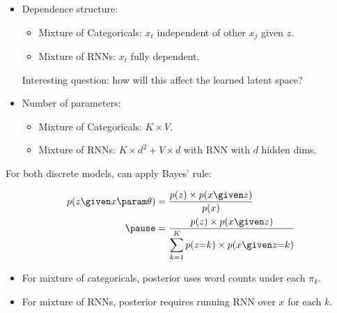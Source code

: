 \begin{frame}
    
    
    
\begin{itemize}
\item Dependence structure:
\begin{itemize}
    \item Mixture of Categoricals: $x_t$ independent of other $x_j$ given $z$.
    \item Mixture of RNNs: $x_t$ fully dependent.
\end{itemize}
Interesting question: how will this affect the learned latent space?
\air
\pause

\item Number of parameters:
\begin{itemize}
\item Mixture of Categoricals: $K \times V $.
    \item Mixture of RNNs: $K \times d^2 + V \times d$ with RNN with $d$ hidden dims.
\end{itemize}
\end{itemize}

\end{frame}

\begin{frame}
For both discrete models, can apply Bayes' rule:

\begin{align*}
    p(z \given x \param \theta) &= \frac{p(z ) \times p(x \given z )}{p(x )}\\
    \pause
    &= \frac{p(z) \times p(x \given z )}{\displaystyle \sum_{k=1}^K p(z{=}k ) \times p(x \given z{=}k )}
\end{align*}

\air
\air

\pause
\begin{itemize}
    \item For mixture of categoricals, posterior uses word counts under each $\pi_k$.
    \item For mixture of RNNs, posterior requires running RNN over $x$ for each $k$.
\end{itemize}
\end{frame}

